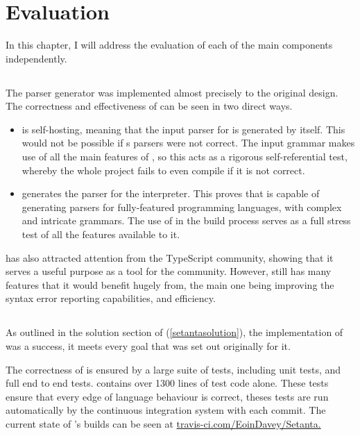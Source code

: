\chapter{Evaluation}

In this chapter, I will address the evaluation of each of the main components independently.

\section{\tsPEG{}}

The \tsPEG{} parser generator was implemented almost precisely to the original design. The correctness and effectiveness of \tsPEG{} can be seen in two direct ways.
\begin{itemize}
    \item \tsPEG{} is self-hosting, meaning that the input parser for \tsPEG{} is generated by \tsPEG{} itself. This would not be possible if \tsPEG{}s parsers were not correct. The input grammar makes use of all the main features of \tsPEG{}, so this acts as a rigorous self-referential test, whereby the whole project fails to even compile if it is not correct.
    \item \tsPEG{} generates the parser for the \Setanta{} interpreter. This proves that \tsPEG{} is capable of generating parsers for fully-featured programming languages, with complex and intricate grammars. The use of \tsPEG{} in the \Setanta{} build process serves as a full stress test of all the features available to it.
\end{itemize}

\tsPEG{} has also attracted attention from the TypeScript community, showing that it serves a useful purpose as a tool for the community. However, \tsPEG{} still has many features that it would benefit hugely from, the main one being improving the syntax error reporting capabilities, and efficiency.

\section{\Setanta{}}

As outlined in the solution section of \Setanta{} (\ref{setantasolution}), the implementation of \Setanta{} was a success, it meets every goal that was set out originally for it.

The correctness of \Setanta{} is ensured by a large suite of tests, including unit tests, and full end to end tests. \Setanta{} contains over 1300 lines of test code alone. These tests ensure that every edge of language behaviour is correct, theses tests are run automatically by the continuous integration system with each commit. The current state of \Setanta{}'s builds can be seen at \href{https://travis-ci.com/EoinDavey/Setanta}{travis-ci.com/EoinDavey/Setanta.}

